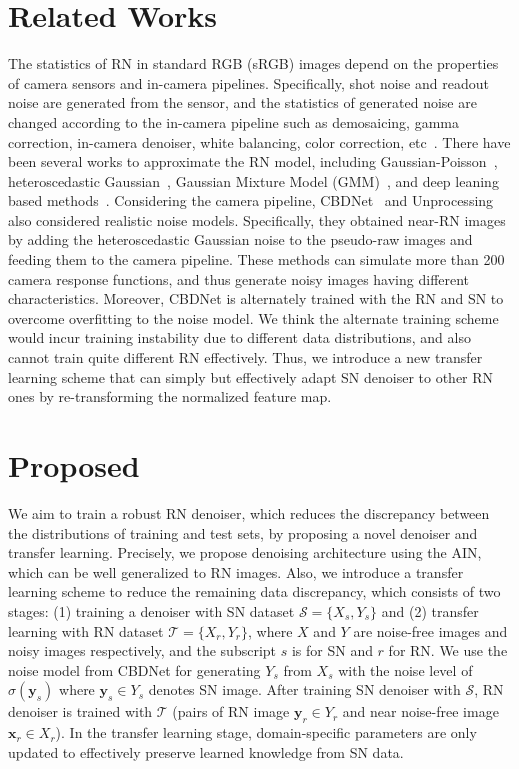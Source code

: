 \documentclass[10pt,twocolumn,letterpaper]{article}
\begin{document}
\section{Related Works}
The statistics of RN in standard RGB (sRGB) images depend on the properties of camera sensors and in-camera pipelines.
Specifically, shot noise and readout noise are generated from the sensor, and the statistics of generated noise are changed according to the in-camera pipeline such as demosaicing, gamma correction, in-camera denoiser, white balancing, color correction, etc~\cite{ortiz2004radiometric}.
There have been several works to approximate the RN model, including Gaussian-Poisson~\cite{foi2008practical,liu2014practical}, heteroscedastic Gaussian~\cite{hasinoff2010noise}, Gaussian Mixture Model (GMM)~\cite{zhu2016noise}, and deep leaning based methods~\cite{chen2018image,abdelhamed2019noise}.
Considering the camera pipeline, CBDNet~\cite{guo2019toward} and Unprocessing~\cite{brooks2019unprocessing} also considered realistic noise models. Specifically, they obtained near-RN images by adding the heteroscedastic Gaussian noise to the pseudo-raw images and feeding them to the camera pipeline.
These methods can simulate more than 200 camera response functions, and thus generate noisy images having different characteristics.
Moreover, CBDNet is alternately trained with the RN and SN to overcome overfitting to the noise model.
We think the alternate training scheme would incur training instability due to different data distributions, and also cannot train quite different RN  effectively.
Thus, we introduce a new transfer learning scheme that can simply but effectively adapt SN denoiser to other RN ones by re-transforming the normalized feature map.





\section{Proposed}
We aim to train a robust RN denoiser, which reduces the discrepancy between the distributions of training and test sets, by proposing a novel denoiser and transfer learning.
Precisely, we propose denoising architecture using the AIN, which can be well generalized to RN images.
Also, we introduce a transfer learning scheme to reduce the remaining data discrepancy, which consists of two stages:
(1) training a denoiser with SN dataset $\mathcal{S} = \{X_s,Y_s\}$ and (2) transfer learning with RN dataset $\mathcal{T} = \{X_r,Y_r\}$, where $X$ and $Y$ are noise-free images and noisy images respectively, and the subscript $s$ is for SN and $r$ for RN. We use the noise model from CBDNet for generating $Y_s$ from $X_s$ with the noise level of  ${\sigma}(\textbf{y}_s)$ where $\textbf{y}_s \in Y_s$ denotes SN image.  
After training SN denoiser with $\mathcal{S}$, RN denoiser is trained with $\mathcal{T}$ (pairs of RN image $\textbf{y}_r \in Y_r$ and near noise-free image $\textbf{x}_r \in X_r$). 
In the transfer learning stage, domain-specific parameters are only updated to effectively preserve learned knowledge from SN data.
\end{document}
